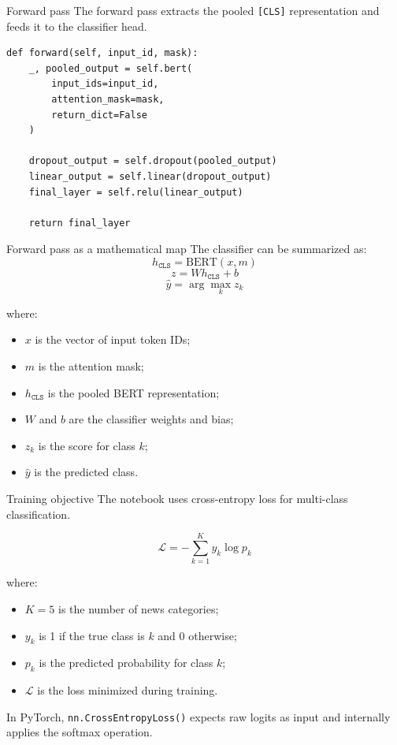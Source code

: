 \documentclass[aspectratio=169]{beamer}
\begin{document}
\begin{frame}[fragile]{Forward pass}
The forward pass extracts the pooled \texttt{[CLS]} representation and feeds it to the classifier head.

\begin{lstlisting}[style=pythonstyle]
def forward(self, input_id, mask):
    _, pooled_output = self.bert(
        input_ids=input_id,
        attention_mask=mask,
        return_dict=False
    )

    dropout_output = self.dropout(pooled_output)
    linear_output = self.linear(dropout_output)
    final_layer = self.relu(linear_output)

    return final_layer
\end{lstlisting}
\end{frame}

\begin{frame}{Forward pass as a mathematical map}
The classifier can be summarized as:
\[
h_{\texttt{CLS}} = \mathrm{BERT}(x, m)
\]
\[
z = W h_{\texttt{CLS}} + b
\]
\[
\hat{y} = \arg\max_k z_k
\]

where:
\begin{itemize}
    \item $x$ is the vector of input token IDs;
    \item $m$ is the attention mask;
    \item $h_{\texttt{CLS}}$ is the pooled BERT representation;
    \item $W$ and $b$ are the classifier weights and bias;
    \item $z_k$ is the score for class $k$;
    \item $\hat{y}$ is the predicted class.
\end{itemize}
\end{frame}

\begin{frame}{Training objective}
The notebook uses cross-entropy loss for multi-class classification.

\[
\mathcal{L} = - \sum_{k=1}^{K} y_k \log p_k
\]

where:
\begin{itemize}
    \item $K=5$ is the number of news categories;
    \item $y_k$ is 1 if the true class is $k$ and 0 otherwise;
    \item $p_k$ is the predicted probability for class $k$;
    \item $\mathcal{L}$ is the loss minimized during training.
\end{itemize}

\vspace{0.2cm}

In PyTorch, \texttt{nn.CrossEntropyLoss()} expects raw logits as input and internally applies the softmax operation.
\end{frame}
\end{document}
